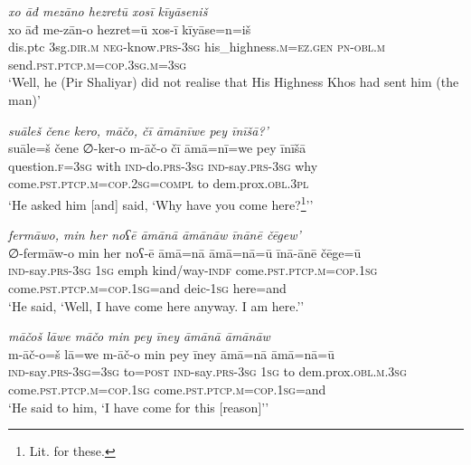 \ea \label{ŽP.134}
\textit{xo āđ mezāno hezretū xosī kīyāseniš} \\ 
\gll xo āđ me-zān-o hezret=ū xos-ī kīyāse=n=iš \\ 
 dis.ptc 3sg\textsc{.dir}\textsc{.m} \textsc{neg-}know\textsc{.prs}\textsc{-3sg} his\_highness\textsc{.m}\textsc{\textsc{=ez.gen}} \textsc{pn}\textsc{-obl}\textsc{.m} send\textsc{.pst}\textsc{.ptcp}\textsc{.m}\textsc{=cop}\textsc{.3sg}\textsc{.m}\textsc{=3sg} \\ 
\glt `Well, he (Pir Shaliyar) did not realise that His Highness Khos had sent him (the man)'
\z 
 
\ea \label{ŽP.135}
\textit{suāleš čene kero, māčo, čī āmānīwe pey īnīšā?’} \\ 
\gll suāle=š čene ∅-ker-o m-āč-o čī āmā=nī=we pey īnīšā \\ 
 question\textsc{.f}\textsc{=3sg} with \textsc{ind-}do\textsc{.prs}\textsc{-3sg} \textsc{ind-}say\textsc{.prs}\textsc{-3sg} why come\textsc{.pst}\textsc{.ptcp}\textsc{.m}\textsc{=cop}\textsc{.\textsc{2sg}}\textsc{=compl} to dem.prox\textsc{.obl}\textsc{.3pl} \\ 
\glt `He asked him [and] said, ‘Why have you come here?\footnote{Lit. for these.}’'
\z 
 
\ea \label{ŽP.136}
\textit{fermāwo, min her noʕē āmānā āmānāw īnānē čēgew’} \\ 
\gll ∅-fermāw-o min her noʕ-ē āmā=nā āmā=nā=ū īnā-ānē čēge=ū \\ 
 \textsc{ind-}say\textsc{.prs}\textsc{-3sg} \textsc{1sg} emph kind/way\textsc{-indf} come\textsc{.pst}\textsc{.ptcp}\textsc{.m}\textsc{=cop}\textsc{.\textsc{1sg}} come\textsc{.pst}\textsc{.ptcp}\textsc{.m}\textsc{=cop}\textsc{.\textsc{1sg}}=and deic\textsc{-\textsc{1sg}} here=and \\ 
\glt `He said, ‘Well, I have come here anyway. I am here.’'
\z 
 
\ea \label{ŽP.138}
\textit{māčoš lāwe māčo min pey īney āmānā āmānāw} \\ 
\gll m-āč-o=š lā=we m-āč-o min pey īney āmā=nā āmā=nā=ū \\ 
 \textsc{ind-}say\textsc{.prs}\textsc{-3sg}\textsc{=3sg} to\textsc{=\textsc{post}} \textsc{ind-}say\textsc{.prs}\textsc{-3sg} \textsc{1sg} to dem.prox\textsc{.obl}\textsc{.m}\textsc{.3sg} come\textsc{.pst}\textsc{.ptcp}\textsc{.m}\textsc{=cop}\textsc{.\textsc{1sg}} come\textsc{.pst}\textsc{.ptcp}\textsc{.m}\textsc{=cop}\textsc{.\textsc{1sg}}=and \\ 
\glt `He said to him, ‘I have come for this [reason]’'
\z 
 
